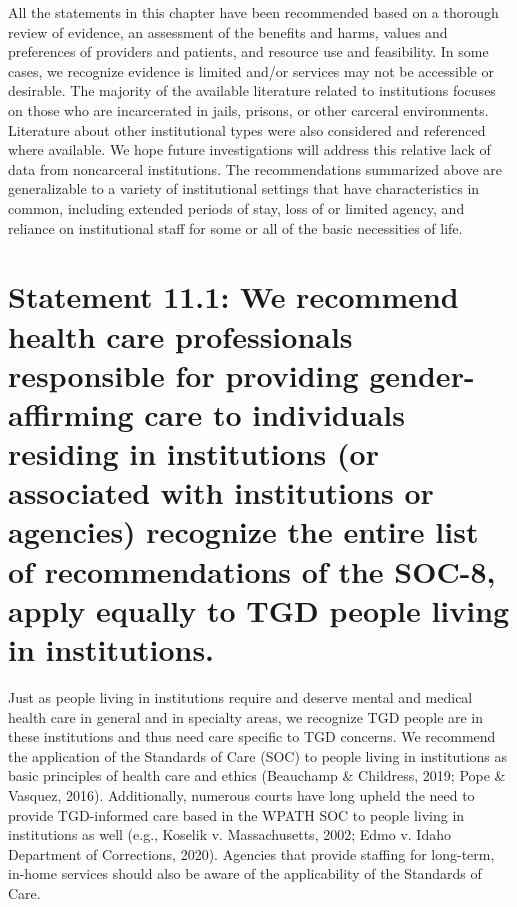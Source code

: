\documentclass[
]{book}
\begin{document}
All the statements in this chapter have been
recommended based on a thorough review of
evidence, an assessment of the benefits and
harms, values and preferences of providers and
patients, and resource use and feasibility. In some
cases, we recognize evidence is limited and/or
services may not be accessible or desirable. The
majority of the available literature related to institutions focuses on those who are incarcerated in
jails, prisons, or other carceral environments.
Literature about other institutional types were
also considered and referenced where available.
We hope future investigations will address this
relative lack of data from noncarceral institutions.
The recommendations summarized above are
generalizable to a variety of institutional settings
that have characteristics in common, including
extended periods of stay, loss of or limited agency,
and reliance on institutional staff for some or all
of the basic necessities of life.

\hypertarget{statement-11.1-we-recommend-health-care-professionals-responsible-for-providing-gender-affirming-care-to-individuals-residing-in-institutions-or-associated-with-institutions-or-agencies-recognize-the-entire-list-of-recommendations-of-the-soc-8-apply-equally-to-tgd-people-living-in-institutions.}{%
\section*{Statement 11.1: We recommend health care professionals responsible for providing gender-affirming care to individuals residing in institutions (or associated with institutions or agencies) recognize the entire list of recommendations of the SOC-8, apply equally to TGD people living in institutions.}\label{statement-11.1-we-recommend-health-care-professionals-responsible-for-providing-gender-affirming-care-to-individuals-residing-in-institutions-or-associated-with-institutions-or-agencies-recognize-the-entire-list-of-recommendations-of-the-soc-8-apply-equally-to-tgd-people-living-in-institutions.}}

Just as people living in institutions require and
deserve mental and medical health care in general
and in specialty areas, we recognize TGD people
are in these institutions and thus need care specific to TGD concerns. We recommend the application of the Standards of Care (SOC) to people
living in institutions as basic principles of health
care and ethics (Beauchamp \& Childress, 2019;
Pope \& Vasquez, 2016). Additionally, numerous
courts have long upheld the need to provide
TGD-informed care based in the WPATH SOC
to people living in institutions as well (e.g.,
Koselik v. Massachusetts, 2002; Edmo v. Idaho
Department of Corrections, 2020). Agencies that
provide staffing for long-term, in-home services
should also be aware of the applicability of the
Standards of Care.
\end{document}
